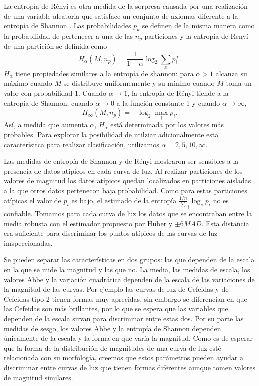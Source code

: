 \documentclass[letterpaper,12pt]{book}
\begin{document}
La entropía de Rényi \cite{renyi_measures_1961} es otra medida de la sorpresa causada por una realización de una variable aleatoria que satisface un conjunto de axiomas diferente a la entropía de Shannon \cite{renyi_measures_1961}. Las probabilidades $p_k$ se definen de la misma manera como la probabilidad de pertenecer a una de las $n_p$ particiones y la entropía de Renyí de una partición se definida como 
\begin{equation}
 H_\alpha(M,n_p) = \frac{1}{1-\alpha}\log_{2}{\sum_{x}p_{i}^{\alpha}}.
\end{equation}
$H_\alpha$ tiene propiedades similares a la entropía de shannon: para $\alpha >1$ alcanza su máximo cuando $M$ se distribuye uniformemente y su mínimo cuando $M$ toma un valor con probabilidad 1. Cuando $\alpha\to 1$, la entropía de Rényi tiende a la entropía de Shannon; cuando $\alpha\to 0$ a la función constante 1 y cuando $\alpha\to\infty$,
 \begin{equation}
 H_\infty(M,n_p) = -\log_{2}{\max_{i}{p_i}}.
\end{equation}
Así, a medida que aumenta $\alpha$, $H_\alpha$ está determinada por los valores más probables. Para explorar la posibilidad de utilziar adicionalmente esta caracterísitca para realizar clasificación, utilizamos  $\alpha = 2, 5, 10, \infty$.

Las medidas de entropía de Shannon y de Rényi mostraron ser sensibles a la presencia de datos atípicos en cada curva de luz. Al realizar particiones de los valores de magnitud los datos atípicos quedan localizados en particiones aisladas a la que otros datos pertenecon baja probabilidad. Como para estas particiones atípicas el valor de $p_i$ es bajo, el estimado de la entropía $\frac{1/n}\sum_i\log_{s}p_i$ no es confiable. Tomamos para cada curva de luz los datos que se encontraban entre la media robusta con el estimador propuesto por Huber y $\pm 6MAD$. Esta distancia era suficiente para discriminar los puntos atípicos de las curvas de luz imspeccionadas.

Se pueden separar las características en dos grupos: las que dependen de la escala en la que se mide la magnitud y las que no. La media, las medidas de escala, los valores Abbe y la variación cuadrática dependen de la escala de las variaciones de la magnitud de las curvas. Por ejemplo las curvas de luz de Cefeidas y de Cefeidas tipo 2 tienen formas muy aprecidas, sin embargo se diferencian en que las Cefeidas son más brillantes, por lo que se espera que las variables que dependen de la escala sirvan para discriminar entre estas dos. Por su parte las medidas de sesgo, los valores Abbe y la entropía de Shannon dependen únicamente de la escala y la forma en que varía la magnitud.  Como es de esperar que la forma de la distribución de magnitudes de una curva de luz esté relacionada con su morfología, creemos que estos parámetros pueden ayudar a discriminar entre curvas de luz que tienen formas diferentes aunque tomen valores de magnitud similares.
\end{document}
